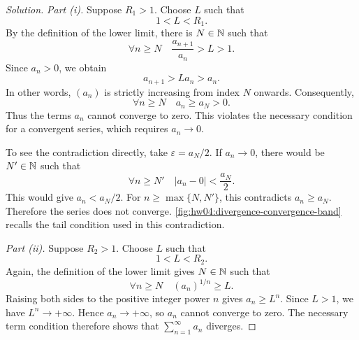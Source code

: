 \begin{proof}[Solution]
  \emph{Part (i).} Suppose $R_1>1$. Choose $L$ such that
  \[
    1<L<R_1.
  \]
  By the definition of the lower limit, there is
  $N\in\mathbb{N}$ such that
  \[
    \forall n\ge N\quad
    \frac{a_{n+1}}{a_n}>L>1.
  \]
  Since $a_n>0$, we obtain
  \[
    a_{n+1}>La_n>a_n.
  \]
  In other words, $(a_n)$ is strictly increasing
  from index $N$ onwards. Consequently,
  \[
    \forall n\ge N\quad a_n\ge a_N>0.
  \]
  Thus the terms $a_n$ cannot converge to zero.
  This violates the necessary condition for a
  convergent series, which requires $a_n\to0$.

  To see the contradiction directly, take $\varepsilon=a_N/2$.
  If $a_n\to0$, there would be $N'\in\mathbb{N}$ such that
  \[
    \forall n\ge N'\quad
    |a_n-0|<\frac{a_N}{2}.
  \]
  This would give $a_n<a_N/2$.
  For $n\ge\max\{N,N'\}$, this contradicts $a_n\ge a_N$.
  Therefore the series does not converge.
  \autoref{fig:hw04:divergence-convergence-band}
  recalls the tail condition used in this contradiction.
  \begin{marginfigure}
    \centering
    
    \caption[The tail condition for convergence.]{A convergence-band recall.
      Beyond $N$, every term must lie strictly between $L-\varepsilon$
      and $L+\varepsilon$. This example has limit $L=1$;
      the proof above tests convergence to $0$.}
    \label{fig:hw04:divergence-convergence-band}
  \end{marginfigure}

  \emph{Part (ii).} Suppose $R_2>1$. Choose $L$ such that
  \[
    1<L<R_2.
  \]
  Again, the definition of the lower limit gives
  $N\in\mathbb{N}$ such that
  \[
    \forall n\ge N\quad
    (a_n)^{1/n}\ge L.
  \]
  Raising both sides to the positive integer power $n$ gives $a_n\ge L^n$.
  Since $L>1$, we have $L^n\to+\infty$. Hence $a_n\to+\infty$,
  so $a_n$ cannot converge to zero.
  The necessary term condition therefore shows that
  $\sum_{n=1}^{\infty}a_n$ diverges.
\end{proof}
